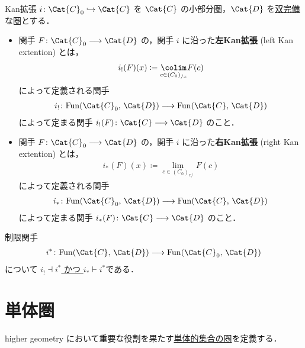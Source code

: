 \documentclass[TQFT_main]{subfiles}
\begin{document}
\begin{mydef}[label=def:Kanext]{Kan拡張}
    $i \colon \Cat{C}_0 \hookrightarrow \Cat{C}$ を $\Cat{C}$ の小部分圏，$\Cat{D}$ を\hyperref[def:complete]{双完備}な圏とする．
    \begin{itemize}
        \item 関手 $F \colon \Cat{C}_0 \lto \Cat{D}$ の，関手 $i$ に沿った\textbf{左Kan拡張} (left Kan extention) とは，
        \begin{align}
            i_{!} (F)(x) \coloneqq \underset{c \in (C_0)_{/x}}{\colim} F(c)
        \end{align}
        によって定義される関手
        \begin{align}
            i_{!} \colon \mathrm{Fun} (\Cat{C}_0,\, \Cat{D}) \lto \mathrm{Fun} (\Cat{C},\, \Cat{D})
        \end{align}
        によって定まる関手 $i_!(F) \colon \Cat{C} \lto \Cat{D}$ のこと． 
        \item   関手 $F \colon \Cat{C}_0 \lto \Cat{D}$ の，関手 $i$ に沿った\textbf{右Kan拡張} (right Kan extention) とは，
        \begin{align}
            i_{*} (F)(x) \coloneqq \underset{c \in (C_0)_{x/}}{\lim} F(c)
        \end{align}
        によって定義される関手
        \begin{align}
            i_{*} \colon \mathrm{Fun} (\Cat{C}_0,\, \Cat{D}) \lto \mathrm{Fun} (\Cat{C},\, \Cat{D})
        \end{align}
        によって定まる関手 $i_*(F) \colon \Cat{C} \lto \Cat{D}$ のこと． 
    \end{itemize}
    
\end{mydef}
制限関手
\begin{align}
    i^* \colon \mathrm{Fun} (\Cat{C},\, \Cat{D}) \lto \mathrm{Fun} (\Cat{C}_0,\, \Cat{D})
\end{align}
について \hyperref[def:adjoint]{$i_{!} \dashv i^*$ かつ $i_* \vdash i^*$}である．

\section{単体圏}

higher geometry において重要な役割を果たす\hyperref[def:SimpSet]{単体的集合の圏}を定義する．
\end{document}
